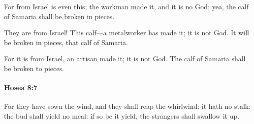 			\begin{versebox}
					\item[BHS] 
					\item[LXX] 
					\item[ASV] For from Israel is even this; the workman made it, and it is no God; yea, the calf of Samaria shall be broken in pieces.
					\item[NIV] They are from Israel! This calf—a metalworker has made it; it is not God. It will be broken in pieces, that calf of Samaria.
					\item[NRSV] For it is from Israel, an artisan made it; it is not God. The calf of Samaria shall be broken to pieces.
			\end{versebox}

		\paragraph{Hosea 8:7} %
			\label{HOSEA-8-7}

			For they have sown the wind, and they shall reap the whirlwind: it hath no stalk: the bud shall yield no meal: if so be it yield, the strangers shall swallow it up.

